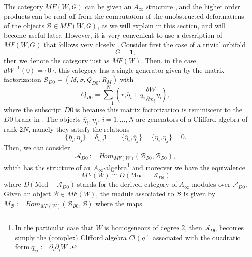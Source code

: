 \documentclass[a4paper,11pt]{article}
\numberwithin{equation}{section}
\begin{document}
The category $MF(W,G)$ can be given an $A_{\infty}$ structure 
\cite{caldararu2010curved}, and the higher order products can be read off from 
the 
computation of the unobstructed deformations of the objects  
$\mathcal{B}\in MF(W,G)$, as we will explain in this section, and will become 
useful later. However, it is very convenient to use a description of $MF(W,G)$ 
that follows very closely \cite{Kapustin:2002bi}. Consider first the case of 
a trivial orbifold 
\begin{equation}
G=\mathbf{1},
\end{equation}
then we denote the category just as $MF(W)$. 
Then, in the case $dW^{-1}(0)=\{ 0\}$, this category has a single generator 
\cite{dyckerhoff2011compact} given by the matrix factorization 
$\mathcal{B}_{D0}=(M,\sigma,Q_{D0},R_{M})$ with
\begin{equation}\label{Qd0explicit}
Q_{D0} = \sum_{i=1}^N\left( x_i \overline{\eta}_i +q_{i} 
\frac{\partial W}{\partial x_i} \eta_i \right),
\end{equation}
where the subscript $D0$ is because this matrix factorization is reminiscent to 
the $D0$-brane in \cite{Kapustin:2002bi}. The objects $\overline{\eta}_i$, 
$\eta_i$, $i=1,\ldots, N$ are generators of a Clifford algebra of rank $2N$, 
namely they satisfy the relations
\begin{equation}
\{\overline{\eta}_{i},\eta_j \}=\delta_{i,j}\mathbf{1}\qquad 
\{\overline{\eta}_{i},\overline{\eta}_{j}\}=\{\eta_{i},\eta
_{j}\}=0.
\end{equation}
Then, we can consider 
\begin{equation}
\mathcal{A}_{D0}:=Hom_{MF(W)}(\mathcal{B}_{D0},\mathcal{B}_{D0}),
\end{equation}
which has 
the structure of an $A_{\infty}$-algebra\footnote{In the particular case that 
$W$ 
is homogeneous of degree $2$, then $\mathcal{A}_{D0}$ becomes simply the 
(complex) Clifford algebra $Cl(q)$ associated with the quadratic form 
$q_{ij}:=\partial_{i}\partial_{j}W$ \cite{Kapustin:2002bi,Hori:2000ic}.} 
\cite{dyckerhoff2011compact} and moreover we have the equivalence
\begin{equation}
MF(W)\cong D(\mathrm{Mod}-\mathcal{A}_{D0})
\end{equation}
where $D(\mathrm{Mod}-\mathcal{A}_{D0})$ stands for the derived category of 
$A_{\infty}$-modules over $\mathcal{A}_{D0}$. Given an object $\mathcal{B}\in 
MF(W)$, the module associated to $\mathcal{B}$ is given by 
$M_{\mathcal{B}}:=Hom_{MF(W)}(\mathcal{B}_{D0},\mathcal{B})$ where the maps 
\end{document}
